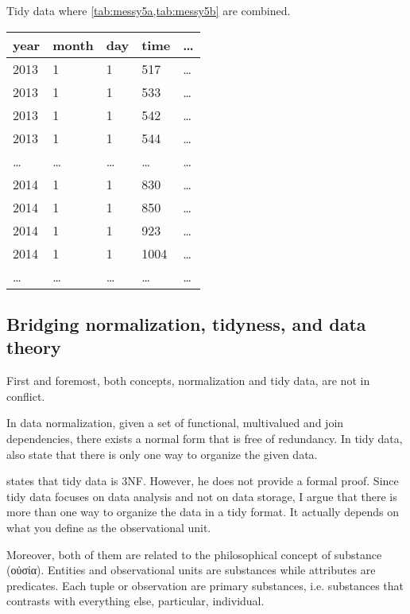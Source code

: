 \begin{tablebox}[label=tab:tidy5]{Tidy data where \cref{tab:messy5a,tab:messy5b} are combined.}
  \centering
  \begin{tabular}{lllll}
    \toprule
    year & month & day & time & \dots \\
    \midrule
    2013 & 1 & 1 & 517 & \dots \\
    2013 & 1 & 1 & 533 & \dots \\
    2013 & 1 & 1 & 542 & \dots \\
    2013 & 1 & 1 & 544 & \dots \\
    \dots & \dots & \dots & \dots & \dots \\
    2014 & 1 & 1 & 830 & \dots \\
    2014 & 1 & 1 & 850 & \dots \\
    2014 & 1 & 1 & 923 & \dots \\
    2014 & 1 & 1 & 1004 & \dots \\
    \dots & \dots & \dots & \dots & \dots \\
    \bottomrule
  \end{tabular}
\end{tablebox}

\clearpage
\subsection{Bridging normalization, tidyness, and data theory}
\label{sub:bridge}

First and foremost, both concepts, normalization and tidy data, are not in conflict.

In data normalization, given a set of functional, multivalued and join dependencies, there
exists a normal form that is free of redundancy.  In tidy data,
\citeauthor{Wickham2023} also state that there is only one way to organize the given data.

\textcite{Wickham2014} states that tidy data is 3NF.  However, he does not provide a
formal proof.  Since tidy data focuses on data analysis and not on data storage, I argue
that there is more than one way to organize the data in a tidy format.  It actually
depends on what you define as the observational unit.

Moreover, both of them are related to the philosophical concept of substance (οὐσία).
Entities and observational units are substances while attributes are predicates.
Each tuple or observation are primary substances, i.e. substances that contrasts with
everything else, particular, individual.

